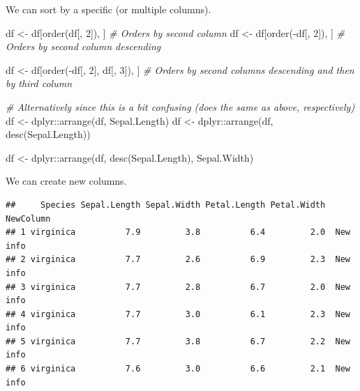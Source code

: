 \documentclass[
]{book}
\newenvironment{Shaded}{\begin{snugshade}}{\end{snugshade}}
\newcommand{\CommentTok}[1]{\textcolor[rgb]{0.56,0.35,0.01}{\textit{#1}}}
\newcommand{\DecValTok}[1]{\textcolor[rgb]{0.00,0.00,0.81}{#1}}
\newcommand{\FunctionTok}[1]{\textcolor[rgb]{0.00,0.00,0.00}{#1}}
\newcommand{\NormalTok}[1]{#1}
\newcommand{\OtherTok}[1]{\textcolor[rgb]{0.56,0.35,0.01}{#1}}
\newcommand{\SpecialCharTok}[1]{\textcolor[rgb]{0.00,0.00,0.00}{#1}}
\newcommand{\StringTok}[1]{\textcolor[rgb]{0.31,0.60,0.02}{#1}}
\begin{document}
We can sort by a specific (or multiple columns).

\begin{Shaded}
\begin{Highlighting}[]
\NormalTok{df }\OtherTok{\textless{}{-}}\NormalTok{ df[}\FunctionTok{order}\NormalTok{(df[, }\DecValTok{2}\NormalTok{]), ]  }\CommentTok{\# Orders by second column}
\NormalTok{df }\OtherTok{\textless{}{-}}\NormalTok{ df[}\FunctionTok{order}\NormalTok{(}\SpecialCharTok{{-}}\NormalTok{df[, }\DecValTok{2}\NormalTok{]), ]  }\CommentTok{\# Orders by second column descending}

\NormalTok{df }\OtherTok{\textless{}{-}}\NormalTok{ df[}\FunctionTok{order}\NormalTok{(}\SpecialCharTok{{-}}\NormalTok{df[, }\DecValTok{2}\NormalTok{], df[, }\DecValTok{3}\NormalTok{]), ]  }\CommentTok{\# Orders by second columns descending and then by third column}

\CommentTok{\# Alternatively since this is a bit confusing (does the same as above, respectively)}
\NormalTok{df }\OtherTok{\textless{}{-}}\NormalTok{ dplyr}\SpecialCharTok{::}\FunctionTok{arrange}\NormalTok{(df, Sepal.Length)}
\NormalTok{df }\OtherTok{\textless{}{-}}\NormalTok{ dplyr}\SpecialCharTok{::}\FunctionTok{arrange}\NormalTok{(df, }\FunctionTok{desc}\NormalTok{(Sepal.Length))}

\NormalTok{df }\OtherTok{\textless{}{-}}\NormalTok{ dplyr}\SpecialCharTok{::}\FunctionTok{arrange}\NormalTok{(df, }\FunctionTok{desc}\NormalTok{(Sepal.Length), Sepal.Width)}
\end{Highlighting}
\end{Shaded}

We can create new columns.

\begin{Shaded}
\end{Shaded}

\begin{verbatim}
##     Species Sepal.Length Sepal.Width Petal.Length Petal.Width NewColumn
## 1 virginica          7.9         3.8          6.4         2.0  New info
## 2 virginica          7.7         2.6          6.9         2.3  New info
## 3 virginica          7.7         2.8          6.7         2.0  New info
## 4 virginica          7.7         3.0          6.1         2.3  New info
## 5 virginica          7.7         3.8          6.7         2.2  New info
## 6 virginica          7.6         3.0          6.6         2.1  New info
\end{verbatim}
\end{document}
